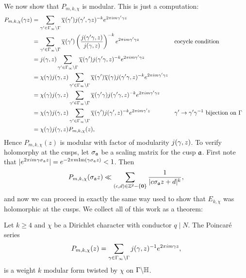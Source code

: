       We now show that $P_{m,k,\chi}$ is modular. This is just a computation:
      \begin{align*}
        P_{m,k,\chi}(\gamma z) &= \sum_{\gamma' \in \Gamma_{\infty}\backslash\Gamma}\overline{\chi}(\gamma')j(\gamma',\gamma z)^{-k}e^{2\pi im\gamma'\gamma z} \\
        &= \sum_{\gamma' \in \Gamma_{\infty}\backslash\Gamma}\overline{\chi}(\gamma')\left(\frac{j(\gamma'\gamma,z)}{j(\gamma,z)}\right)^{-k}e^{2\pi im\gamma'\gamma z} && \text{cocycle condition} \\
        &= j(\gamma,z)\sum_{\gamma' \in \Gamma_{\infty}\backslash\Gamma}\overline{\chi}(\gamma')j(\gamma'\gamma,z)^{-k}e^{2\pi im\gamma'\gamma z} \\
        &= \chi(\gamma)j(\gamma,z)\sum_{\gamma' \in \Gamma_{\infty}\backslash\Gamma}\overline{\chi}(\gamma')\overline{\chi}(\gamma)j(\gamma'\gamma,z)^{-k}e^{2\pi im\gamma'\gamma z} \\
        &= \chi(\gamma)j(\gamma,z)\sum_{\gamma' \in \Gamma_{\infty}\backslash\Gamma}\overline{\chi}(\gamma'\gamma)j(\gamma'\gamma,z)^{-k}e^{2\pi im\gamma'\gamma z} \\
        &= \chi(\gamma)j(\gamma,z)\sum_{\gamma' \in \Gamma_{\infty}\backslash\Gamma}\overline{\chi}(\gamma')j(\gamma',z)^{-k}e^{2\pi im\gamma'z} && \text{$\gamma' \to \gamma'\gamma^{-1}$ bijection on $\Gamma$} \\
        &= \chi(\gamma)j(\gamma,z)P_{m,k,\chi}(z),
      \end{align*}
      Hence $P_{m,k,\chi}(z)$ is modular with factor of modularity $j(\gamma,z)$. To verify holomorphy at the cusps, let $\sigma_{\mathfrak{a}}$ be a scaling matrix for the cusp $\mathfrak{a}$. First note that $|e^{2\pi im\gamma\sigma_{\mathfrak{a}}z}| = e^{-2\pi m\mathrm{Im}(\gamma\sigma_{\mathfrak{a}}z)} < 1$. Then
      \[
        P_{m,k,\chi}(\sigma_{\mathfrak{a}}z) \ll \sum_{(c,d) \in \mathbb{Z}^{2}-\{\mathbf{0}\}}\frac{1}{|c\sigma_{\mathfrak{a}}z+d|^{k}},
      \]
      and now we can proceed in exactly the same way used to show that $E_{k,\chi}$ was holomorphic at the cusps. We collect all of this work as a theorem:

      \begin{theorem}
        Let $k \ge 4$ and $\chi$ be a Dirichlet character with conductor $q \mid N$. The Poincar\'e series
        \[
          P_{m,k,\chi}(z) = \sum_{\gamma \in \Gamma_{\infty}\backslash\Gamma}j(\gamma,z)^{-1}e^{2\pi im\gamma z},
        \]
        is a weight $k$ modular form twisted by $\chi$ on $\Gamma\backslash\mathbb{H}$.
      \end{theorem}
